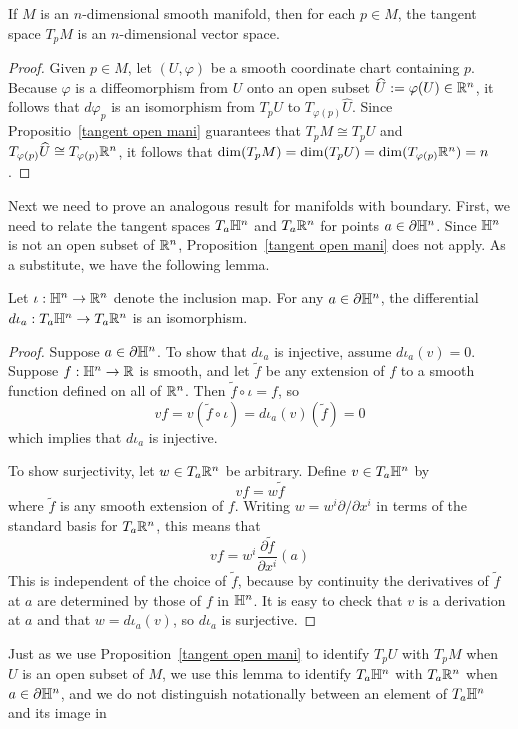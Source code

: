 \begin{proposition}
If $M$ is an $n$-dimensional smooth manifold, then for each $p\in M$, the tangent space $T_pM$ is an $n$-dimensional vector space.
\end{proposition}
\begin{proof}
Given $p\in M$, let $(U,\varphi)$ be a smooth coordinate chart containing $p$. Because $\varphi$ is a diffeomorphism from $U$ onto an open subset $\widehat{U}:=\varphi(U)\in\mathbb{R}^n$, it follows that $d\varphi_p$ is an isomorphism from $T_pU$ to $T_{\varphi(p)}\widehat{U}$. Since Propositio~\ref{tangent open mani} guarantees that $T_pM\cong T_pU$ and $T_{\varphi(p)}\widehat{U}\cong T_{\varphi(p)}\mathbb{R}^n$, it follows that $\dim(T_pM)=\dim(T_pU)=\dim(T_{\varphi(p)}\mathbb{R}^n)=n$.
\end{proof}
Next we need to prove an analogous result for manifolds with boundary. First, we need to relate the tangent spaces $T_a\mathbb{H}^n$ and $T_a\mathbb{R}^n$ for points $a\in\partial\mathbb{H}^n$. Since $\mathbb{H}^n$ is not an open subset of $\mathbb{R}^n$, Proposition~\ref{tangent open mani} does not apply. As a substitute, we have the following lemma.
\begin{proposition}\label{tangent H^n}
Let $\iota:\mathbb{H}^n\to\mathbb{R}^n$ denote the inclusion map. For any $a\in\partial\mathbb{H}^n$, the differential $d\iota_a:T_a\mathbb{H}^n\to T_a\mathbb{R}^n$ is an isomorphism.
\end{proposition}
\begin{proof}
Suppose $a\in\partial\mathbb{H}^n$. To show that $d\iota_a$ is injective, assume $d\iota_a(v)=0$. Suppose $f:\mathbb{H}^n\to\mathbb{R}$ is smooth, and let $\widetilde{f}$ be any extension of $f$ to a smooth function defined on all of $\mathbb{R}^n$. Then $\widetilde{f}\circ\iota=f$, so
\[vf=v(\widetilde{f}\circ\iota)=d\iota_a(v)(\widetilde{f})=0\]
which implies that $d\iota_a$ is injective.\par
To show surjectivity, let $w\in T_a\mathbb{R}^n$ be arbitrary. Define $v\in T_a\mathbb{H}^n$ by
\[vf=w\widetilde{f}\]
where $\widetilde{f}$ is any smooth extension of $f$. Writing $w=w^i\partial/\partial x^i$ in terms of the standard basis for $T_a\mathbb{R}^n$, this means that
\[vf=w^i\frac{\partial\widetilde{f}}{\partial x^i}(a)\]
This is independent of the choice of $\widetilde{f}$, because by continuity the derivatives of $\widetilde{f}$ at $a$ are determined by those of $f$ in $\mathbb{H}^n$. It is easy to check that $v$ is a derivation at
$a$ and that $w=d\iota_a(v)$, so $d\iota_a$ is surjective.
\end{proof}
Just as we use Proposition~\ref{tangent open mani} to identify $T_pU$ with $T_pM$ when $U$ is an open subset of $M$, we use this lemma to identify $T_a\mathbb{H}^n$ with $T_a\mathbb{R}^n$ when $a\in\partial\mathbb{H}^n$, and we do not distinguish notationally between an element of $T_a\mathbb{H}^n$ and its image in
